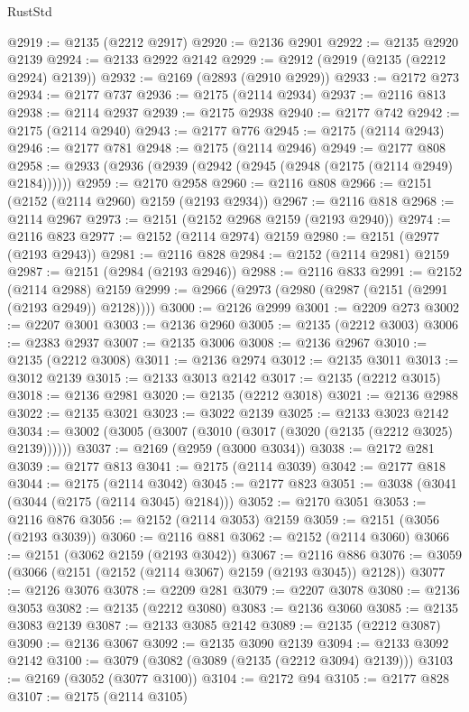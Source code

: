 \begin{lexlean}{RustStd}
\begin{coremodule}
@2919 := @2135 (@2212 @2917)
@2920 := @2136 @2901
@2922 := @2135 @2920 @2139
@2924 := @2133 @2922 @2142
@2929 := @2912 (@2919 (@2135 (@2212 @2924) @2139))
@2932 := @2169 (@2893 (@2910 @2929))
@2933 := @2172 @273
@2934 := @2177 @737
@2936 := @2175 (@2114 @2934)
@2937 := @2116 @813
@2938 := @2114 @2937
@2939 := @2175 @2938
@2940 := @2177 @742
@2942 := @2175 (@2114 @2940)
@2943 := @2177 @776
@2945 := @2175 (@2114 @2943)
@2946 := @2177 @781
@2948 := @2175 (@2114 @2946)
@2949 := @2177 @808
@2958 := @2933 (@2936 (@2939 (@2942 (@2945 (@2948 (@2175 (@2114 @2949) @2184))))))
@2959 := @2170 @2958
@2960 := @2116 @808
@2966 := @2151 (@2152 (@2114 @2960) @2159 (@2193 @2934))
@2967 := @2116 @818
@2968 := @2114 @2967
@2973 := @2151 (@2152 @2968 @2159 (@2193 @2940))
@2974 := @2116 @823
@2977 := @2152 (@2114 @2974) @2159
@2980 := @2151 (@2977 (@2193 @2943))
@2981 := @2116 @828
@2984 := @2152 (@2114 @2981) @2159
@2987 := @2151 (@2984 (@2193 @2946))
@2988 := @2116 @833
@2991 := @2152 (@2114 @2988) @2159
@2999 := @2966 (@2973 (@2980 (@2987 (@2151 (@2991 (@2193 @2949)) @2128))))
@3000 := @2126 @2999
@3001 := @2209 @273
@3002 := @2207 @3001
@3003 := @2136 @2960
@3005 := @2135 (@2212 @3003)
@3006 := @2383 @2937
@3007 := @2135 @3006
@3008 := @2136 @2967
@3010 := @2135 (@2212 @3008)
@3011 := @2136 @2974
@3012 := @2135 @3011
@3013 := @3012 @2139
@3015 := @2133 @3013 @2142
@3017 := @2135 (@2212 @3015)
@3018 := @2136 @2981
@3020 := @2135 (@2212 @3018)
@3021 := @2136 @2988
@3022 := @2135 @3021
@3023 := @3022 @2139
@3025 := @2133 @3023 @2142
@3034 := @3002 (@3005 (@3007 (@3010 (@3017 (@3020 (@2135 (@2212 @3025) @2139))))))
@3037 := @2169 (@2959 (@3000 @3034))
@3038 := @2172 @281
@3039 := @2177 @813
@3041 := @2175 (@2114 @3039)
@3042 := @2177 @818
@3044 := @2175 (@2114 @3042)
@3045 := @2177 @823
@3051 := @3038 (@3041 (@3044 (@2175 (@2114 @3045) @2184)))
@3052 := @2170 @3051
@3053 := @2116 @876
@3056 := @2152 (@2114 @3053) @2159
@3059 := @2151 (@3056 (@2193 @3039))
@3060 := @2116 @881
@3062 := @2152 (@2114 @3060)
@3066 := @2151 (@3062 @2159 (@2193 @3042))
@3067 := @2116 @886
@3076 := @3059 (@3066 (@2151 (@2152 (@2114 @3067) @2159 (@2193 @3045)) @2128))
@3077 := @2126 @3076
@3078 := @2209 @281
@3079 := @2207 @3078
@3080 := @2136 @3053
@3082 := @2135 (@2212 @3080)
@3083 := @2136 @3060
@3085 := @2135 @3083 @2139
@3087 := @2133 @3085 @2142
@3089 := @2135 (@2212 @3087)
@3090 := @2136 @3067
@3092 := @2135 @3090 @2139
@3094 := @2133 @3092 @2142
@3100 := @3079 (@3082 (@3089 (@2135 (@2212 @3094) @2139)))
@3103 := @2169 (@3052 (@3077 @3100))
@3104 := @2172 @94
@3105 := @2177 @828
@3107 := @2175 (@2114 @3105)

\end{coremodule}
\end{lexlean}
